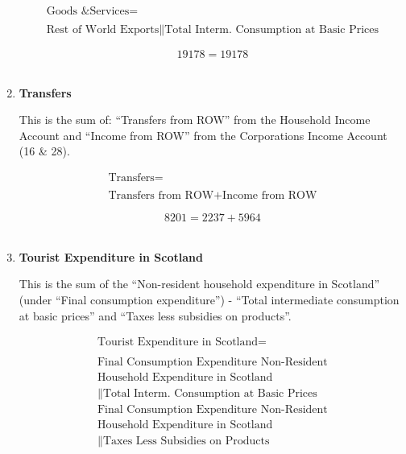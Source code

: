 \begin{enumerate}
\begin{equation}
\begin{split}
\text{Goods \& Services} =  \\ \\
\text{Rest of World Exports}\|\text{Total Interm. Consumption at Basic Prices}
\end{split} \label{eq:2.5.66}
\end{equation}

\begin{equation} \nonumber
19178 = 19178
\end{equation}\\


\item \textbf {Transfers}

This is the sum of: “Transfers from ROW” from the Household Income Account and “Income from ROW” from the Corporations Income Account (16 \& 28).

\begin{equation}
\begin{split}
\text{Transfers} =  \\ \\
\text{Transfers from ROW}+\text{Income from ROW}
\end{split} \label{eq:2.5.67}
\end{equation}

\begin{equation} \nonumber
8201 = 2237+5964
\end{equation}\\



\item \textbf {Tourist Expenditure in Scotland}

This is the sum of the “Non-resident household expenditure in Scotland” (under “Final consumption expenditure”) - “Total intermediate consumption at basic prices” and “Taxes less subsidies on products”. \cite{ScotGov2013a}

\begin{equation}
\begin{split}
\text{Tourist Expenditure in Scotland} =  \\ \\
\text{Final Consumption Expenditure Non-Resident}\\
\text{Household Expenditure in Scotland}\\
\|\text{Total Interm. Consumption at Basic Prices}\\
\text{Final Consumption Expenditure Non-Resident}\\
\text{Household Expenditure in Scotland}\\
\|\text{Taxes Less Subsidies on Products}
\end{split} \label{eq:2.5.68}
\end{equation}


\end{enumerate}
